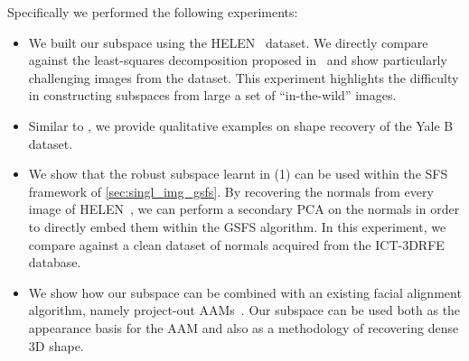 Specifically we performed the following experiments:
\begin{itemize}
    \item We built our subspace using the HELEN~\cite{le2012interactive} 
          dataset. We directly compare against the least-squares decomposition
          proposed in~\cite{KemelmacherShlizerman:2013iv} and show particularly
          challenging images from the dataset. This experiment highlights the
          difficulty in constructing subspaces from large a set of
          ``in-the-wild'' images.
    \item Similar to \citet{KemelmacherShlizerman:2013iv}, we provide
          qualitative examples on shape recovery of the Yale B dataset.
    \item We show that the robust subspace learnt in (1) can be used within the
          SFS framework of \cref{sec:singl_img_gsfs}. By recovering the normals
          from every image of HELEN~\cite{le2012interactive}, we can perform a
          secondary PCA on the normals in order to directly embed them within
          the GSFS algorithm. In this experiment, we compare against a clean
          dataset of normals acquired from the 
          ICT-3DRFE~\cite{stratou2012exploring} database.
    \item We show how our subspace can be combined with an existing facial
    alignment algorithm, namely project-out AAMs~\cite{matthews2004active}. Our
    subspace can be used both as the appearance basis for the AAM and also as a
    methodology of recovering dense 3D shape.
\end{itemize}

